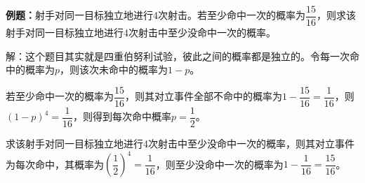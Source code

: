 \documentclass[UTF8, 12pt]{ctexart}
\begin{document}
\textbf{例题：}射手对同一目标独立地进行4次射击。若至少命中一次的概率为$\dfrac{15}{16}$，则求该射手对同一目标独立地进行4次射击中至少没命中一次的概率。

解：这个题目其实就是四重伯努利试验，彼此之间的概率都是独立的。令每一次命中的概率为$p$，则该次未命中的概率为$1-p$。

若至少命中一次的概率为$\dfrac{15}{16}$，则其对立事件全部不命中的概率为$1-\dfrac{15}{16}=\dfrac{1}{16}$，则$(1-p)^4=\dfrac{1}{16}$，则得到每次命中概率$p=\dfrac{1}{2}$。

求该射手对同一目标独立地进行4次射击中至少没命中一次的概率，则其对立事件为每次命中，其概率为$\left(\dfrac{1}{2}\right)^4=\dfrac{1}{16}$，则至少没命中一次的概率为$1-\dfrac{1}{16}=\dfrac{15}{16}$。
\end{document}
